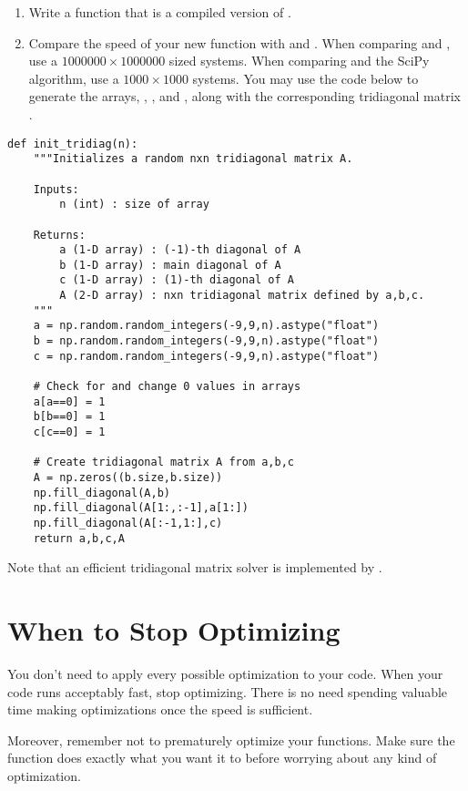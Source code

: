 \begin{problem} \label{prob:tridiag}
\leavevmode
\begin{enumerate}
\item Write a function  that is a compiled version of .
\item Compare the speed of your new function with  and .
When comparing  and , use a $1000000 \times 1000000$ sized systems.
When comparing  and the SciPy algorithm, use a $1000 \times 1000$ systems. You may use the code below to generate the arrays, , , and , along with the corresponding tridiagonal matrix .
\end{enumerate}
\begin{lstlisting}
def init_tridiag(n):
    """Initializes a random nxn tridiagonal matrix A.

    Inputs:
        n (int) : size of array

    Returns:
        a (1-D array) : (-1)-th diagonal of A
        b (1-D array) : main diagonal of A
        c (1-D array) : (1)-th diagonal of A
        A (2-D array) : nxn tridiagonal matrix defined by a,b,c.
    """
    a = np.random.random_integers(-9,9,n).astype("float")
    b = np.random.random_integers(-9,9,n).astype("float")
    c = np.random.random_integers(-9,9,n).astype("float")

    # Check for and change 0 values in arrays
    a[a==0] = 1
    b[b==0] = 1
    c[c==0] = 1

    # Create tridiagonal matrix A from a,b,c
    A = np.zeros((b.size,b.size))
    np.fill_diagonal(A,b)
    np.fill_diagonal(A[1:,:-1],a[1:])
    np.fill_diagonal(A[:-1,1:],c)
    return a,b,c,A
\end{lstlisting}
Note that an efficient tridiagonal matrix solver is implemented by .
\end{problem}

\section*{When to Stop Optimizing}
You don't need to apply every possible optimization to your code.
When your code runs acceptably fast, stop optimizing. There is no need spending valuable time making optimizations once the speed is sufficient.

Moreover, remember not to prematurely optimize your functions. Make sure the function does exactly what you want it to before worrying about any kind of optimization.

